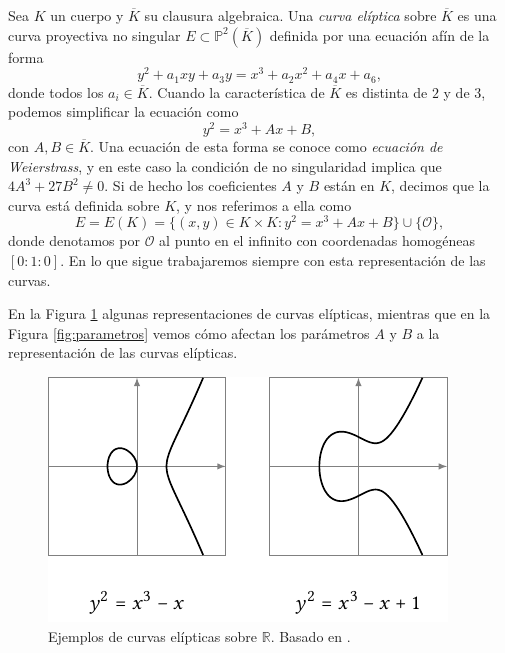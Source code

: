 \documentclass[
  a4paper,
  12pt,
  spanish,
]{scrartcl}
\begin{document}
    Sea $K$ un cuerpo y $\overline{K}$ su clausura algebraica. Una \textit{curva elíptica} sobre $\overline{K}$ es una curva proyectiva no singular $E \subset \mathbb{P}^2(\overline{K})$ definida por una ecuación afín de la forma \[ y^2 + a_1xy + a_3y = x^3 +a_2x^2 + a_4x + a_6, \] donde todos los $a_i \in \overline{K}$.
    Cuando la característica de $\overline{K}$ es distinta de $2$ y de $3$, podemos simplificar la ecuación como \[ y^2 = x^3 + Ax + B, \] con $A,B \in \overline{K}$. Una ecuación de esta forma se conoce como \textit{ecuación de Weierstrass}, y en este caso la condición de no singularidad implica que $4A^3 + 27B^2 \neq 0$. Si de hecho los coeficientes $A$ y $B$ están en $K$, decimos que la curva está definida sobre $K$, y nos referimos a ella como \[ E = E(K) = \{ (x, y) \in K \times K : y^2 = x^3 + Ax + B\} \cup \{\mathcal{O}\}, \] donde denotamos por $\mathcal{O}$ al punto en el infinito con coordenadas homogéneas $[0:1:0]$. En lo que sigue trabajaremos siempre con esta representación de las curvas.

En la Figura \ref{fig:curva} algunas representaciones de curvas elípticas, mientras que en la Figura \ref{fig:parametros} vemos cómo afectan los parámetros $A$ y $B$ a la representación de las curvas elípticas.

\begin{figure}[h]
  \centering
  \includegraphics[width=.75\textwidth]{img/ejemplos-curvas}
  \caption{Ejemplos de curvas elípticas sobre $\mathbb{R}$. Basado en \parencite{eichlseder_elliptic_2016}.}
  \label{fig:curva}
\end{figure}
\end{document}
